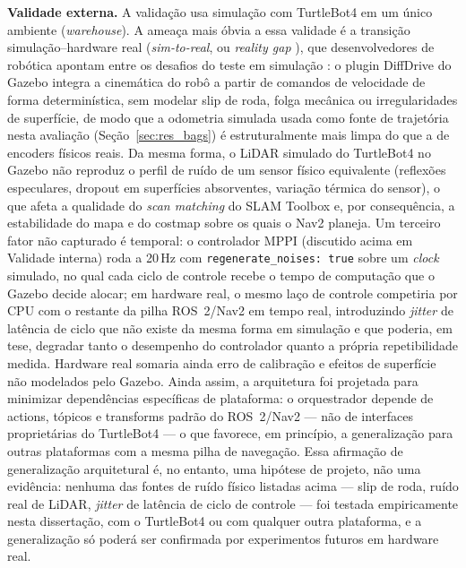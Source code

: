 \textbf{Validade externa.} A validação usa simulação com TurtleBot4 em um único
ambiente (\textit{warehouse}). A ameaça mais óbvia a essa validade é a transição
simulação--hardware real (\textit{sim-to-real}, ou \textit{reality gap}
\cite{jakobi1995}), que desenvolvedores de robótica apontam entre os
desafios do teste em simulação \cite{afzal2020}: o
plugin DiffDrive do Gazebo integra a cinemática do robô a partir de comandos de
velocidade de forma determinística, sem modelar slip de roda, folga mecânica ou
irregularidades de superfície, de modo que a odometria simulada usada como fonte
de trajetória nesta avaliação (Seção~\ref{sec:res_bags}) é estruturalmente mais
limpa do que a de encoders físicos reais. Da mesma forma, o LiDAR simulado do
TurtleBot4 no Gazebo não reproduz o perfil de ruído de um sensor físico
equivalente (reflexões especulares, dropout em superfícies absorventes,
variação térmica do sensor), o que afeta a qualidade do \textit{scan matching}
do SLAM Toolbox e, por consequência, a estabilidade do mapa e do costmap sobre
os quais o Nav2 planeja. Um terceiro fator não capturado é temporal: o
controlador MPPI (discutido acima em Validade interna) roda a 20\,Hz com
\texttt{regenerate\_\allowbreak noises: true} sobre um \textit{clock} simulado,
no qual cada ciclo de controle recebe o tempo de computação que o Gazebo decide
alocar; em hardware real, o mesmo laço de controle competiria por CPU com o
restante da pilha ROS~2/Nav2 em tempo real, introduzindo \textit{jitter} de
latência de ciclo que não existe da mesma forma em simulação e que poderia, em
tese, degradar tanto o desempenho do controlador quanto a própria repetibilidade
medida. Hardware real somaria ainda erro de calibração e efeitos de superfície
não modelados pelo Gazebo. Ainda assim, a arquitetura foi projetada para
minimizar dependências específicas de plataforma: o orquestrador depende de
actions, tópicos e transforms padrão do ROS~2/Nav2 --- não de interfaces
proprietárias do TurtleBot4 --- o que favorece, em princípio, a generalização
para outras plataformas com a mesma pilha de navegação. Essa afirmação de
generalização arquitetural é, no entanto, uma hipótese de projeto, não uma
evidência: nenhuma das fontes de ruído físico listadas acima --- slip de roda,
ruído real de LiDAR, \textit{jitter} de latência de ciclo de controle --- foi
testada empiricamente nesta dissertação, com o TurtleBot4 ou com qualquer outra
plataforma, e a generalização só poderá ser confirmada por experimentos futuros
em hardware real.

